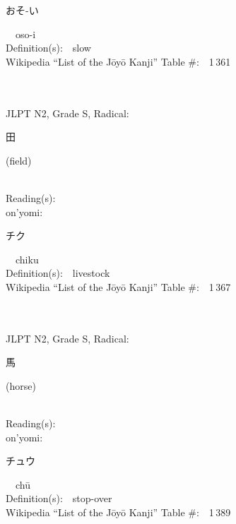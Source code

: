 \begin{multicols}{2}
{\hspace*{2em}}{\begin{CJK}{UTF8}{min} おそ-い \end{CJK}}\ \ oso-i\ \ \\
Definition(s):\ \ slow \\
Wikipedia ``List of the J\=oy\=o Kanji'' Table \#:\ \ 1\,361 \\
\ \ \\
{\fontsize{34pt}{40pt}  }\ \ \\  %
{JLPT N2, Grade S, Radical:\ \ {\begin{CJK}{UTF8}{min} 田 \end{CJK}} (field) } \\
Reading(s):\ \ \\
{\hspace*{1em}}on'yomi:\ \ \\
{\hspace*{2em}}{\begin{CJK}{UTF8}{min} チク \end{CJK}}\ \ chiku\ \ \\
Definition(s):\ \ livestock \\
Wikipedia ``List of the J\=oy\=o Kanji'' Table \#:\ \ 1\,367 \\
\ \ \\
{\fontsize{34pt}{40pt}  }\ \ \\  %
{JLPT N2, Grade S, Radical:\ \ {\begin{CJK}{UTF8}{min} 馬 \end{CJK}} (horse) } \\
Reading(s):\ \ \\
{\hspace*{1em}}on'yomi:\ \ \\
{\hspace*{2em}}{\begin{CJK}{UTF8}{min} チュウ \end{CJK}}\ \ ch\=u\ \ \\
Definition(s):\ \ stop-over \\
Wikipedia ``List of the J\=oy\=o Kanji'' Table \#:\ \ 1\,389 \\
\ \ \\

\end{multicols}
